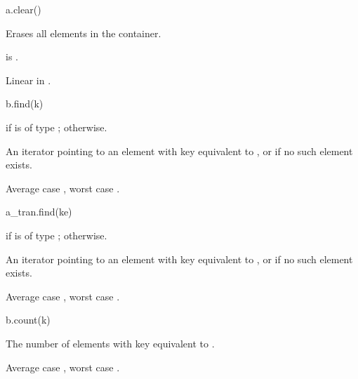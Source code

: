 %
\begin{itemdecl}
a.clear()
\end{itemdecl}

\begin{itemdescr}
\pnum
\result
{}

\pnum
\effects
Erases all elements in the container.

\pnum
\ensures
{} is .

\pnum
\complexity
Linear in .
\end{itemdescr}

%
\begin{itemdecl}
b.find(k)
\end{itemdecl}

\begin{itemdescr}
\pnum
\result
{} if  is of type ;
 otherwise.

\pnum
\returns
An iterator pointing to an element with key equivalent to , or
 if no such element exists.

\pnum
\complexity
Average case , worst case .
\end{itemdescr}

%
\begin{itemdecl}
a_tran.find(ke)
\end{itemdecl}

\begin{itemdescr}
\pnum
\result
{} if  is of type ;
 otherwise.

\pnum
\returns
An iterator pointing to an element with key equivalent to , or
 if no such element exists.

\pnum
\complexity
Average case , worst case .
\end{itemdescr}

%
\begin{itemdecl}
b.count(k)
\end{itemdecl}

\begin{itemdescr}
\pnum
\result
{}

\pnum
\returns
The number of elements with key equivalent to .

\pnum
\complexity
Average case , worst case .
\end{itemdescr}

